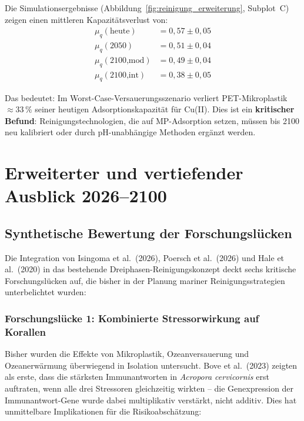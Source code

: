 ﻿\documentclass[12pt,a4paper]{article}
\theoremstyle{definition}
\theoremstyle{remark}
\newcommand{\MP}{Mikroplastik}
\begin{document}
Die Simulationsergebnisse (Abbildung~\ref{fig:reinigung_erweiterung}, Subplot~C)
zeigen einen mittleren Kapazit\"atsverlust von:
\begin{align}
  \mu_q(\text{heute}) &= 0{,}57 \pm 0{,}05 \\
  \mu_q(2050)          &= 0{,}51 \pm 0{,}04 \\
  \mu_q(2100\text{,mod}) &= 0{,}49 \pm 0{,}04 \\
  \mu_q(2100\text{,int}) &= 0{,}38 \pm 0{,}05
\end{align}

Das bedeutet: Im Worst-Case-Versauerungsszenario verliert PET-Mikroplastik
$\approx 33\,\%$ seiner heutigen Adsorptionskapazit\"at f\"ur Cu(II).
Dies ist ein \textbf{kritischer Befund}: Reinigungstechnologien, die auf
MP-Adsorption setzen, m\"ussen bis 2100 neu kalibriert oder durch pH-unabh\"angige
Methoden erg\"anzt werden.

\section{Erweiterter und vertiefender Ausblick 2026--2100}
\label{sec:ausblick_erweitert}

\subsection{Synthetische Bewertung der Forschungslücken}
\label{subsec:forschungsluecken}

Die Integration von Isingoma et al.\ (2026), Poersch et al.\ (2026)
und Hale et al.\ (2020) in das bestehende Dreiphasen-Reinigungskonzept
deckt sechs kritische Forschungslücken auf, die bisher in der Planung
mariner Reinigungsstrategien unterbelichtet wurden:

\subsubsection{Forschungslücke 1: Kombinierte Stressorwirkung auf Korallen}

Bisher wurden die Effekte von \MP{}, Ozeanversauerung und Ozeanerwärmung
überwiegend in Isolation untersucht. Bove et al.\ (2023) zeigten als erste,
dass die stärksten Immunantworten in \textit{Acropora cervicornis} erst
auftraten, wenn alle drei Stressoren gleichzeitig wirkten -- die
Genexpression der Immunantwort-Gene wurde dabei multiplikativ verstärkt,
nicht additiv. Dies hat unmittelbare Implikationen für die Risikoabschätzung:
\end{document}
